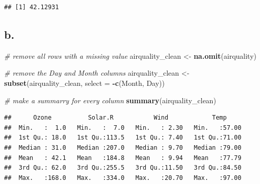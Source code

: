 \documentclass[
]{article}
\newenvironment{Shaded}{\begin{snugshade}}{\end{snugshade}}
\newcommand{\AttributeTok}[1]{\textcolor[rgb]{0.13,0.29,0.53}{#1}}
\newcommand{\CommentTok}[1]{\textcolor[rgb]{0.56,0.35,0.01}{\textit{#1}}}
\newcommand{\DecValTok}[1]{\textcolor[rgb]{0.00,0.00,0.81}{#1}}
\newcommand{\FunctionTok}[1]{\textcolor[rgb]{0.13,0.29,0.53}{\textbf{#1}}}
\newcommand{\NormalTok}[1]{#1}
\newcommand{\OtherTok}[1]{\textcolor[rgb]{0.56,0.35,0.01}{#1}}
\newcommand{\SpecialCharTok}[1]{\textcolor[rgb]{0.81,0.36,0.00}{\textbf{#1}}}
\newcommand{\StringTok}[1]{\textcolor[rgb]{0.31,0.60,0.02}{#1}}
\begin{document}
\begin{verbatim}
## [1] 42.12931
\end{verbatim}

\subsection{b.}\label{b.-1}

\begin{Shaded}
\begin{Highlighting}[]
\CommentTok{\# remove all rows with a missing value}
\NormalTok{airquality\_clean }\OtherTok{\textless{}{-}} \FunctionTok{na.omit}\NormalTok{(airquality)}

\CommentTok{\# remove the Day and Month columns}
\NormalTok{airquality\_clean }\OtherTok{\textless{}{-}} \FunctionTok{subset}\NormalTok{(airquality\_clean, }\AttributeTok{select =} \SpecialCharTok{{-}}\FunctionTok{c}\NormalTok{(Month, Day))}

\CommentTok{\# make a summarry for every column}
\FunctionTok{summary}\NormalTok{(airquality\_clean)}
\end{Highlighting}
\end{Shaded}

\begin{verbatim}
##      Ozone          Solar.R           Wind            Temp      
##  Min.   :  1.0   Min.   :  7.0   Min.   : 2.30   Min.   :57.00  
##  1st Qu.: 18.0   1st Qu.:113.5   1st Qu.: 7.40   1st Qu.:71.00  
##  Median : 31.0   Median :207.0   Median : 9.70   Median :79.00  
##  Mean   : 42.1   Mean   :184.8   Mean   : 9.94   Mean   :77.79  
##  3rd Qu.: 62.0   3rd Qu.:255.5   3rd Qu.:11.50   3rd Qu.:84.50  
##  Max.   :168.0   Max.   :334.0   Max.   :20.70   Max.   :97.00
\end{verbatim}

\begin{Shaded}
\end{Shaded}
\end{document}
